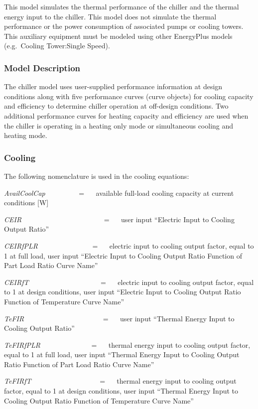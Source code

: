 This model simulates the thermal performance of the chiller and the thermal energy input to the chiller. This model does not simulate the thermal performance or the power consumption of associated pumps or cooling towers. This auxiliary equipment must be modeled using other EnergyPlus models (e.g.~Cooling Tower:Single Speed).

\subsubsection{Model Description}\label{model-description-1-003}

The chiller model uses user-supplied performance information at design conditions along with five performance curves (curve objects) for cooling capacity and efficiency to determine chiller operation at off-design conditions. Two additional performance curves for heating capacity and efficiency are used when the chiller is operating in a heating only mode or simultaneous cooling and heating mode.

\subsubsection{Cooling}\label{cooling-1}

The following nomenclature is used in the cooling equations:

\emph{AvailCoolCap}~~~~~~~~~ = ~~ available full-load cooling capacity at current conditions {[}W{]}

\emph{CEIR}~~~~~~~~~~~~~~~~~~~~~~~ = ~~ user input ``Electric Input to Cooling Output Ratio''

\emph{CEIRfPLR}~~~~~~~~~~~~~~~ = ~~ electric input to cooling output factor, equal to 1 at full load, user input ``Electric Input to Cooling Output Ratio Function of Part Load Ratio Curve Name''

\emph{CEIRfT}~~~~~~~~~~~~~~~~~~~~ = ~~ electric input to cooling output factor, equal to 1 at design conditions, user input ``Electric Input to Cooling Output Ratio Function of Temperature Curve Name''

\emph{TeFIR}~~~~~~~~~~~~~~~~~~~~~~ = ~~ user input ``Thermal Energy Input to Cooling Output Ratio''

\emph{TeFIRfPLR}~~~~~~~~~~~~~~ = ~~ thermal energy input to cooling output factor, equal to 1 at full load, user input ``Thermal Energy Input to Cooling Output Ratio Function of Part Load Ratio Curve Name''

\emph{TeFIRfT}~~~~~~~~~~~~~~~~~~~ = ~~ thermal energy input to cooling output factor, equal to 1 at design conditions, user input ``Thermal Energy Input to Cooling Output Ratio Function of Temperature Curve Name''

